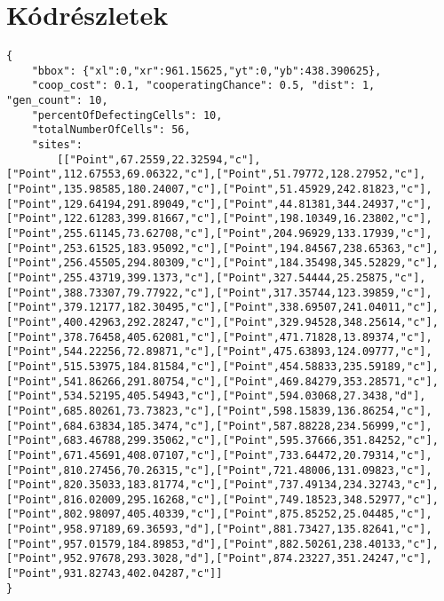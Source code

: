 \chapter{Kódrészletek}
\label{ch:appendix}

\begin{lstlisting}[caption={A Kliens üzenete amikor egy szimulációt kér}, label={dataStructure}]
{
	"bbox": {"xl":0,"xr":961.15625,"yt":0,"yb":438.390625},
	"coop_cost": 0.1, "cooperatingChance": 0.5, "dist": 1, "gen_count": 10,
	"percentOfDefectingCells": 10,
	"totalNumberOfCells": 56,
	"sites":
		[["Point",67.2559,22.32594,"c"],["Point",112.67553,69.06322,"c"],["Point",51.79772,128.27952,"c"],["Point",135.98585,180.24007,"c"],["Point",51.45929,242.81823,"c"],["Point",129.64194,291.89049,"c"],["Point",44.81381,344.24937,"c"],["Point",122.61283,399.81667,"c"],["Point",198.10349,16.23802,"c"],["Point",255.61145,73.62708,"c"],["Point",204.96929,133.17939,"c"],["Point",253.61525,183.95092,"c"],["Point",194.84567,238.65363,"c"],["Point",256.45505,294.80309,"c"],["Point",184.35498,345.52829,"c"],["Point",255.43719,399.1373,"c"],["Point",327.54444,25.25875,"c"],["Point",388.73307,79.77922,"c"],["Point",317.35744,123.39859,"c"],["Point",379.12177,182.30495,"c"],["Point",338.69507,241.04011,"c"],["Point",400.42963,292.28247,"c"],["Point",329.94528,348.25614,"c"],["Point",378.76458,405.62081,"c"],["Point",471.71828,13.89374,"c"],["Point",544.22256,72.89871,"c"],["Point",475.63893,124.09777,"c"],["Point",515.53975,184.81584,"c"],["Point",454.58833,235.59189,"c"],["Point",541.86266,291.80754,"c"],["Point",469.84279,353.28571,"c"],["Point",534.52195,405.54943,"c"],["Point",594.03068,27.3438,"d"],["Point",685.80261,73.73823,"c"],["Point",598.15839,136.86254,"c"],["Point",684.63834,185.3474,"c"],["Point",587.88228,234.56999,"c"],["Point",683.46788,299.35062,"c"],["Point",595.37666,351.84252,"c"],["Point",671.45691,408.07107,"c"],["Point",733.64472,20.79314,"c"],["Point",810.27456,70.26315,"c"],["Point",721.48006,131.09823,"c"],["Point",820.35033,183.81774,"c"],["Point",737.49134,234.32743,"c"],["Point",816.02009,295.16268,"c"],["Point",749.18523,348.52977,"c"],["Point",802.98097,405.40339,"c"],["Point",875.85252,25.04485,"c"],["Point",958.97189,69.36593,"d"],["Point",881.73427,135.82641,"c"],["Point",957.01579,184.89853,"d"],["Point",882.50261,238.40133,"c"],["Point",952.97678,293.3028,"d"],["Point",874.23227,351.24247,"c"],["Point",931.82743,402.04287,"c"]]
}
\end{lstlisting}

\newpage


